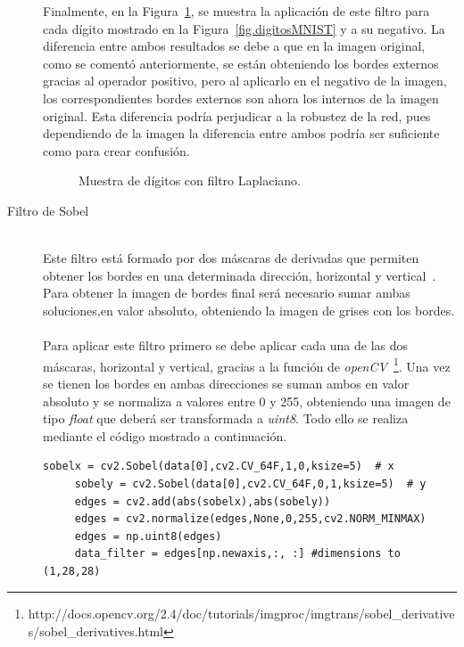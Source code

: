 \begin{description}
	Finalmente, en la Figura~\ref{fig.laplacian}, se muestra la aplicación de este filtro para cada dígito mostrado en la Figura~\ref{fig.digitosMNIST} y a su negativo. La diferencia entre ambos resultados se debe a que en la imagen original, como se comentó anteriormente, se están obteniendo los bordes externos gracias al operador positivo, pero al aplicarlo en el negativo de la imagen, los correspondientes bordes externos son ahora los internos de la imagen original. Esta diferencia podría perjudicar a la robustez de la red, pues dependiendo de la imagen la diferencia entre ambos podría ser suficiente como para crear confusión.
	\begin{figure}[H]
		\centering
		 \hspace{10pt}
		\caption{Muestra de dígitos con filtro Laplaciano.}
		\label{fig.laplacian}
	\end{figure}
	\vspace{-10pt}
	\item[Filtro de Sobel] \hfill 
	\vspace{5pt}
	\\
	Este filtro está formado por dos máscaras de derivadas  que permiten obtener los bordes en una determinada dirección, horizontal y vertical~\cite{sobel}. Para obtener la imagen de bordes final será necesario sumar ambas soluciones,en valor absoluto, obteniendo la imagen de grises con los bordes.\\
	\vspace{-10pt}
	\\
	Para aplicar este filtro primero se debe aplicar cada una de las dos máscaras, horizontal y vertical, gracias a la función de \textit{openCV}~\footnote{http://docs.opencv.org/2.4/doc/tutorials/imgproc/imgtrans/sobel\_derivatives/sobel\_derivatives.html}. Una vez se tienen los bordes en ambas direcciones se suman ambos en valor absoluto y se normaliza a valores entre 0 y 255, obteniendo una imagen de tipo \textit{float} que deberá ser transformada a \textit{uint8}. Todo ello se realiza mediante el código mostrado a continuación.
	\vspace{25pt}
	\begin{lstlisting}[frame=single]
	 sobelx = cv2.Sobel(data[0],cv2.CV_64F,1,0,ksize=5)  # x
	 sobely = cv2.Sobel(data[0],cv2.CV_64F,0,1,ksize=5)  # y
	 edges = cv2.add(abs(sobelx),abs(sobely))
	 edges = cv2.normalize(edges,None,0,255,cv2.NORM_MINMAX)
	 edges = np.uint8(edges)
	 data_filter = edges[np.newaxis,:, :] #dimensions to (1,28,28)
	\end{lstlisting}
	

\end{description}
